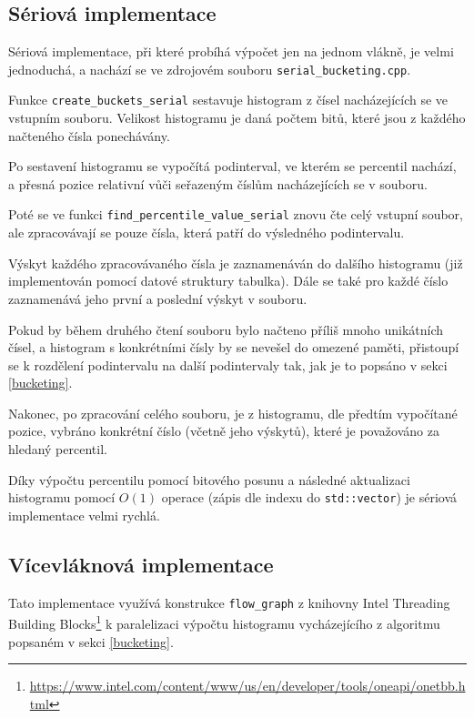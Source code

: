 \documentclass[12pt, a4paper]{article}
\begin{document}
\subsection{Sériová implementace}
Sériová implementace, při které probíhá výpočet jen na jednom vlákně, je velmi jednoduchá, a nachází se ve zdrojovém souboru \texttt{serial\_bucketing.cpp}.


Funkce \texttt{create\_buckets\_serial} sestavuje histogram z čísel nacházejících se ve vstupním souboru.
Velikost histogramu je daná počtem bitů, které jsou z každého načteného čísla ponechávány.

Po sestavení histogramu se vypočítá podinterval, ve kterém se percentil nachází, a přesná pozice relativní vůči seřazeným číslům nacházejících se v souboru. 

Poté se ve funkci \texttt{find\_percentile\_value\_serial} znovu čte celý vstupní soubor, ale zpracovávají se pouze čísla, která patří do výsledného podintervalu.

Výskyt každého zpracovávaného čísla je zaznamenáván do dalšího histogramu (již implementován pomocí datové struktury tabulka). 
Dále se také pro každé číslo zaznamenává jeho první a poslední výskyt v souboru.

Pokud by během druhého čtení souboru bylo načteno příliš mnoho unikátních čísel, a histogram s konkrétními čísly by se nevešel do omezené paměti, přistoupí se k rozdělení podintervalu na další podintervaly tak, jak je to popsáno v sekci \ref{bucketing}.

Nakonec, po zpracování celého souboru, je z histogramu, dle předtím vypočítané pozice, vybráno konkrétní číslo (včetně jeho výskytů), které je považováno za hledaný percentil.

Díky výpočtu percentilu pomocí bitového posunu a následné aktualizaci histogramu pomocí $O(1)$ operace (zápis dle indexu do \texttt{std::vector}) je sériová implementace velmi rychlá.

\subsection{Vícevláknová implementace}
Tato implementace využívá konstrukce \texttt{flow\_graph} z knihovny Intel Threading Building Blocks\footnote{\url{https://www.intel.com/content/www/us/en/developer/tools/oneapi/onetbb.html}} k paralelizaci výpočtu histogramu vycházejícího z algoritmu popsaném v sekci \ref{bucketing}.
\end{document}
